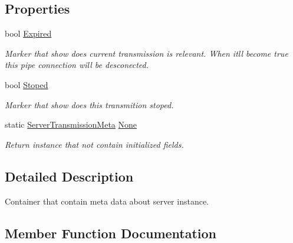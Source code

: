 \subsection*{Properties}
\begin{DoxyCompactItemize}
\item 
bool \mbox{\hyperlink{class_pipes_provider_1_1_server_transmission_meta_acdc3e400b26c044443a9c3ce367433f4}{Expired}}
\begin{DoxyCompactList}\small\item\em Marker that show does current transmission is relevant. When it\textquotesingle{}ll become true this pipe connection will be desconected. \end{DoxyCompactList}\item 
bool \mbox{\hyperlink{class_pipes_provider_1_1_server_transmission_meta_a9b501faba9c2cb9ed8873f1935d95b7c}{Stoped}}
\begin{DoxyCompactList}\small\item\em Marker that show does this transmition stoped. \end{DoxyCompactList}\item 
static \mbox{\hyperlink{class_pipes_provider_1_1_server_transmission_meta}{Server\+Transmission\+Meta}} \mbox{\hyperlink{class_pipes_provider_1_1_server_transmission_meta_aad6b35f35e7976ae9ee3f386b65dd128}{None}}
\begin{DoxyCompactList}\small\item\em Return instance that not contain initialized fields. \end{DoxyCompactList}\end{DoxyCompactItemize}


\subsection{Detailed Description}
Container that contain meta data about server instance. 



\subsection{Member Function Documentation}
\mbox{\label{class_pipes_provider_1_1_server_transmission_meta_a29b2b6d3e06632b362a2101b12f082f7}} 
